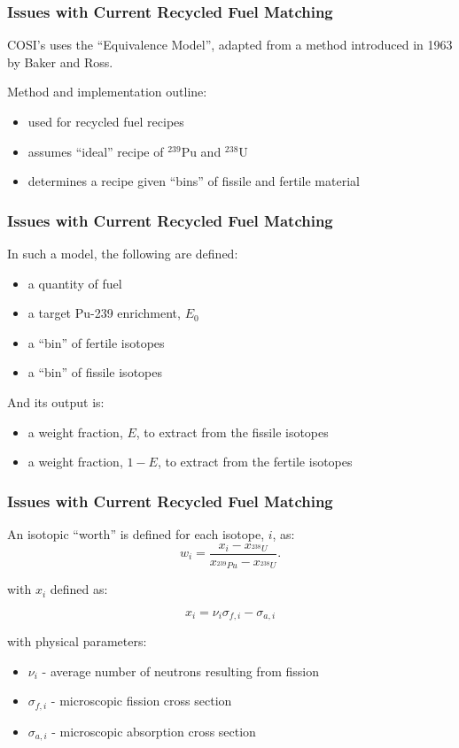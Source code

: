 \begin{frame}[ctb!]
  \frametitle{Issues with Current Recycled Fuel Matching}

  COSI's uses the ``Equivalence Model'', adapted from a method introduced in
  1963 by Baker and Ross\cite{baker_comparison_1963}.
  
  \vspace{0.2cm}

  Method and implementation outline:
  \begin{itemize}
    \item used for recycled fuel recipes
    \item assumes ``ideal'' recipe of $^{239}$Pu and $^{238}$U
    \item determines a recipe given ``bins'' of fissile and fertile material
  \end{itemize}
\end{frame}

\begin{frame}[ctb!]
  \frametitle{Issues with Current Recycled Fuel Matching}

  In such a model, the following are defined:
  \begin{itemize}
    \item a quantity of fuel
    \item a target Pu-239 enrichment, $E_0$
    \item a ``bin'' of fertile isotopes
    \item a ``bin'' of fissile isotopes
  \end{itemize}

  And its output is:
  \begin{itemize}
    \item a weight fraction, $E$, to extract from the fissile isotopes
    \item a weight fraction, $1-E$, to extract from the fertile isotopes
  \end{itemize}
\end{frame}

\begin{frame}[ctb!]
  \frametitle{Issues with Current Recycled Fuel Matching}
  
  An isotopic ``worth'' is defined for each isotope, $i$, as:
  \begin{equation}
    w_i = \frac{x_i - x_{^{238}U}}
    {x_{^{239}Pu} - x_{^{238}U}}.
  \end{equation}

  with $x_i$ defined as:
  
  \begin{equation}
    x_i = \nu_{i} \sigma_{f,i} - \sigma_{a,i}
  \end{equation}

  with physical parameters:
  \begin{itemize}
    \item $\nu_{i}$ - average number of neutrons resulting from fission
    \item $\sigma_{f,i}$ - microscopic fission cross section
    \item $\sigma_{a,i}$ - microscopic absorption cross section
  \end{itemize}
\end{frame}

